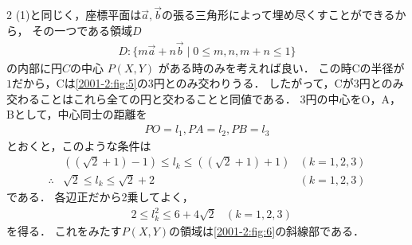 \documentclass[../../main.tex]{subfiles}
\begin{document}
\begin{multicols}{2}
  (1)と同じく，座標平面は$\vec{a},\vec{b}$の張る三角形によって埋め尽くすことができるから，
  その一つである領域$D$
  \begin{align}
    D: \{m\vec{a} + n\vec{b} \mid 0 \le m, n, m+n \le 1\}
  \end{align}
  の内部に円$C$の中心 $P(X,Y)$ がある時のみを考えれば良い．
  この時Cの半径が$1$だから，Cは\cref{2001-2:fig:5}の3円とのみ交わりうる．
  したがって，Cが3円とのみ交わることはこれら全ての円と交わることと同値である．
  3円の中心をO，A，Bとして，中心同士の距離を
  \begin{align}
    PO=l_1, PA=l_2, PB=l_3
  \end{align}
  とおくと，このような条件は
  \begin{align}
    & \left((\sqrt{2}+1)-1\right) \le l_k \le \left((\sqrt{2}+1)+1\right) & (k=1,2,3) \\
    \therefore
    & \sqrt{2} \le l_k \le \sqrt{2}+2                                     & (k=1,2,3)
  \end{align}
  である．
  各辺正だから2乗してよく，
  \begin{align}
    & 2 \le l_k^2 \le 6+4\sqrt{2} & (k=1,2,3)
  \end{align}
  を得る．
  これをみたす$P(X,Y)$の領域は\cref{2001-2:fig:6}の斜線部である．

  \begin{figure}[H]
    \centering
\end{figure}
\end{multicols}
\end{document}
